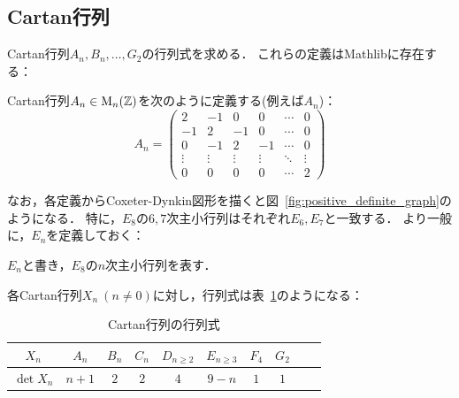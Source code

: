 \subsection{Cartan行列}

Cartan行列$A_n, B_n, \ldots, G_2$の行列式を求める．
これらの定義はMathlibに存在する：

\begin{definition}
  \label{def:CartanMatrix.A}
  \leanok
  Cartan行列$A_n \in \operatorname{M}_n(\mathbb{Z})$を次のように定義する(例えば$A_n$)：
  \begin{equation}
    A_n = \begin{pmatrix}
      2  & -1 & 0  & 0  & \cdots & 0 \\
      -1 & 2  & -1 & 0  & \cdots & 0 \\
      0  & -1 & 2  & -1 & \cdots & 0 \\
      \vdots & \vdots & \vdots & \vdots & \ddots & \vdots \\
      0  & 0  & 0  & 0  & \cdots & 2
    \end{pmatrix}
  \end{equation}
\end{definition}

なお，各定義からCoxeter-Dynkin図形を描くと図~\ref{fig:positive_definite_graph}のようになる．
特に，$E_8$の$6, 7$次主小行列はそれぞれ$E_6, E_7$と一致する．
より一般に，$E_n$を定義しておく：

\begin{definition}
  \label{def:CartanMatrix.E}
  \leanok
  $E_n$と書き，$E_8$の$n$次主小行列を表す．
\end{definition}

\begin{theorem}
  \label{thm:CartanMatrix.det_A}
  \leanok
  各Cartan行列$X_n\ (n \ne 0)$に対し，行列式は表~\ref{table:CartanMatrix.det_A}のようになる：
  \begin{table}[htbp]
    \centering
    \caption{Cartan行列の行列式}
    \label{table:CartanMatrix.det_A}
    \begin{tabular}{c|ccccccccc}
      $X_n$ & $A_n$ & $B_n$ & $C_n$ & $D_{n \ge 2}$ & $E_{n \ge 3}$ & $F_4$ & $G_2$ \\ \hline
      $\det X_n$ & $n+1$ & $2$ & $2$ & $4$ & $9-n$ & $1$ & $1$
    \end{tabular}
  \end{table}
\end{theorem}

